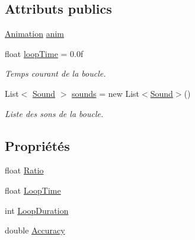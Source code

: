 \subsection*{Attributs publics}
\begin{DoxyCompactItemize}
\item 
\hyperlink{class_animation}{Animation} \hyperlink{class_loop_ad4acc54b546f6270d11c5015c3c5a4e6}{anim}
\item 
float \hyperlink{class_loop_ab6f3df1dceea6e92a1728d8ad3558f4b}{loop\+Time} = 0.\+0f
\begin{DoxyCompactList}\small\item\em Temps courant de la boucle. \end{DoxyCompactList}\item 
List$<$ \hyperlink{class_sound}{Sound} $>$ \hyperlink{class_loop_a36bc41b6866c834ca9b55ecb8c4c2a0f}{sounds} = new List$<$\hyperlink{class_sound}{Sound}$>$()
\begin{DoxyCompactList}\small\item\em Liste des sons de la boucle. \end{DoxyCompactList}\end{DoxyCompactItemize}
\subsection*{Propriétés}
\begin{DoxyCompactItemize}
\item 
float \hyperlink{class_loop_a5225d2e331631be4e6613966b967c8aa}{Ratio}
\item 
float \hyperlink{class_loop_a6ffef5494771b4e64e3a4976e418860a}{Loop\+Time}
\item 
int \hyperlink{class_loop_a7f64ca10d484fe6b88814fb01d39b193}{Loop\+Duration}
\item 
double \hyperlink{class_loop_a7003ed32b3c459138d9c4b5276c5c48d}{Accuracy}
\end{DoxyCompactItemize}
